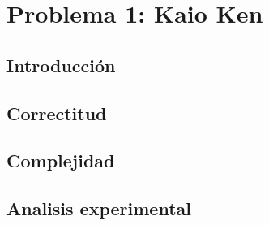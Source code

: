 \section{Problema 1:  Kaio Ken}
\subsection{Introducción}

\subsection{Correctitud}

\subsection{Complejidad}

\subsection{Analisis experimental}


